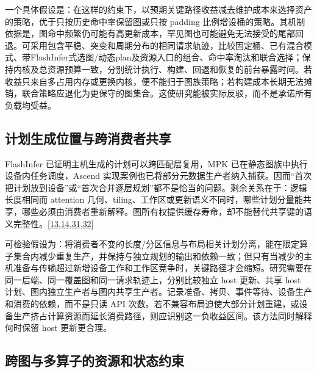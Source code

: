 \documentclass[
  UTF8,
  zihao=5]{ctexart}
\begin{document}
一个具体假设是：在这样的约束下，以预期关键路径收益减去维护成本来选择资产的策略，优于只按历史命中率保留图或只按
padding
比例增设桶的策略。其机制依据是，图命中频繁仍可能有高更新成本，罕见图也可能避免无法接受的尾部回退。可采用包含平稳、突变和周期分布的相同请求轨迹，比较固定桶、已有混合模式、带FlashInfer式选图/动态plan及资源入口的组合、命中率淘汰和联合选择；保持内核及总资源预算一致，分别统计执行、构建、回退和恢复的前台暴露时间。若收益只来自多占用内存或更换内核，便不能归于图族策略；若构建成本长期无法摊销，联合策略应退化为更保守的图集合。这使研究能被实际反驳，而不是承诺所有负载均受益。

\hypertarget{ux8ba1ux5212ux751fux6210ux4f4dux7f6eux4e0eux8de8ux6d88ux8d39ux8005ux5171ux4eab}{%
\subsection{计划生成位置与跨消费者共享}\label{ux8ba1ux5212ux751fux6210ux4f4dux7f6eux4e0eux8de8ux6d88ux8d39ux8005ux5171ux4eab}}

FlashInfer 已证明主机生成的计划可以跨匹配层复用，MPK
已在静态图族中执行设备内任务调度，Ascend
实现案例也已将部分元数据生产者纳入捕获。因而``首次把计划放到设备''或``首次合并逐层规划''都不是恰当的问题。剩余关系在于：逻辑长度相同而
attention
几何、tiling、工作区或更新语义不同时，哪些计划分量能共享，哪些必须由消费者重新解释。图所有权提供缓存寿命，却不能替代共享键的语义完整性。{[}\protect\hyperlink{ref-cheng2026mpk}{13},\protect\hyperlink{ref-ye2025flashinfer}{14},\protect\hyperlink{ref-vllmascendpr21259}{31},\protect\hyperlink{ref-vllmascendpr21281}{32}{]}

可检验假设为：将消费者不变的长度/分区信息与布局相关计划分离，能在限定算子集合内减少重复生产，并保持与独立规划的输出和依赖一致；但只有当减少的主机准备与传输超过新增设备工作和工作区竞争时，关键路径才会缩短。研究需要在同一后端、同一覆盖图和同一请求轨迹上，分别比较独立
host 更新、共享 host
计划、图内独立生产者与图内共享生产者。记录准备、拷贝、事件等待、设备生产和消费的依赖，而不是只读
API
次数。若不兼容布局迫使大部分计划重建，或设备生产挤占计算资源而延长消费路径，则应识别这一负收益区间。该方法同时解释何时保留
host 更新更合理。

\hypertarget{ux8de8ux56feux4e0eux591aux7b97ux5b50ux7684ux8d44ux6e90ux548cux72b6ux6001ux7ea6ux675f}{%
\subsection{跨图与多算子的资源和状态约束}\label{ux8de8ux56feux4e0eux591aux7b97ux5b50ux7684ux8d44ux6e90ux548cux72b6ux6001ux7ea6ux675f}}
\end{document}

